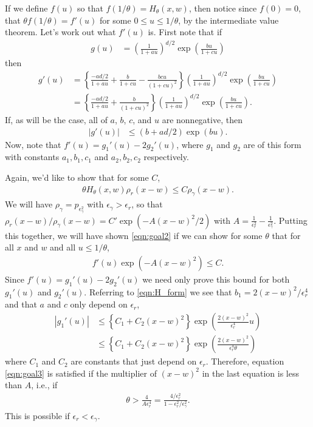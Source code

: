 \documentclass[12pt]{article}
\begin{document}
If we define $f(u)$ so that $f(1/\theta) = H_\theta(x, w)$,
then notice since $f(0) = 0$,
that $\theta f(1/\theta) = f'(u)$ for some $0 \le u \le 1/\theta$,
by the intermediate value theorem.
Let's work out what $f'(u)$ is.
First note that if
\begin{align}
    g(u)
    &=
    \left( \frac{ 1 }{ 1 + a u } \right)^{d/2}
    \exp\left(
    \frac{
    b u
    }{
    1 + c u
    }
    \right)
\end{align}
then
\begin{align}
    g'(u)
    &=
\left\{
    \frac{ - ad/2 }{ 1 + a u }
    +
    \frac{b}{1 + cu}
    -
    \frac{bcu}{(1+cu)^2}
\right\}
    \left( \frac{ 1 }{ 1 + a u } \right)^{d/2}
    \exp\left(
    \frac{
    b u
    }{
    1 + c u
    }
    \right) \\
    &=
\left\{
    \frac{ - ad/2 }{ 1 + a u }
    +
    \frac{b}{(1 + cu)^2}
\right\}
    \left( \frac{ 1 }{ 1 + a u } \right)^{d/2}
    \exp\left(
    \frac{
    b u
    }{
    1 + c u
    }
    \right) .
\end{align}
If, as will be the case, all of $a$, $b$, $c$, and $u$ are nonnegative, then
\begin{align}
|g'(u)|
&\le
 (b + ad/2) \exp(bu) .   
\end{align}
Now, note that $f'(u) = g_1'(u) - 2 g_2'(u)$, where $g_1$ and $g_2$ are of this form
with constants $a_1, b_1, c_1$ and $a_2, b_2, c_2$ respectively.


Again, we'd like to show that for some $C$,
\begin{align}
    \theta H_\theta(x, w) \rho_r(x-w) \le C \rho_\gamma(x-w)  .
\end{align}
We will have $\rho_\gamma = p_{\epsilon_\gamma^2}$ with $\epsilon_\gamma > \epsilon_r$,
so that $\rho_r(x-w) / \rho_\gamma(x-w) = C' \exp(-A (x-w)^2 / 2)$
with $A = \frac{1}{\epsilon_r^2} - \frac{1}{\epsilon_\gamma^2}$.
Putting this together,
we will have shown \eqref{eqn:goal2}
if we can show for some $\theta$ that
for all $x$ and $w$ and all $u \le 1/\theta$,
\begin{align} \label{eqn:goal3}
    f'(u) \exp\left(-A (x-w)^2 \right) \le C .
\end{align}
Since $f'(u) = g_1'(u) - 2 g_2'(u)$ we need only prove this bound
for both $g_1'(u)$ and $g_2'(u)$.
Referring to \eqref{eqn:H_form}
we see that $b_1 = 2(x-w)^2 / \epsilon_r^4$
and that $a$ and $c$ only depend on $\epsilon_r$,
\begin{align}
|g_1'(u)|
&\le
\left\{
    C_1 + C_2 (x-w)^2
\right\}
\exp\left(
    \frac{ 2 (x - w)^2 }{ \epsilon_r^4 } u
\right)  \\
&\le
\left\{
    C_1 + C_2 (x-w)^2
\right\}
\exp\left(
    \frac{ 2 (x - w)^2 }{ \epsilon_r^4 \theta }
\right) 
\end{align}
where $C_1$ and $C_2$ are constants that just depend on $\epsilon_r$.
Therefore, equation \eqref{eqn:goal3} is satisfied
if the multiplier of $(x-w)^2$ in the last equation is less than $A$,
i.e., if
\begin{align}
\theta 
> 
\frac{ 4 }{ A \epsilon_r^4 }
=
\frac{ 4 / \epsilon_r^2 }{1 - \epsilon_r^2 / \epsilon_\gamma^2 } .
\end{align}
This is possible if $\epsilon_r < \epsilon_\gamma$.



\end{document}
